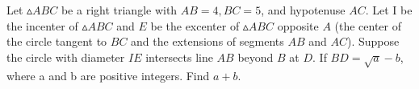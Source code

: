 Let $\vartriangle ABC$ be a right triangle with $AB = 4, BC = 5$, and hypotenuse $AC$. Let I be the incenter of $\vartriangle ABC$ and $E$ be the excenter of $\vartriangle ABC$ opposite $A$ (the center of the circle tangent to $BC$ and the extensions of segments $AB$ and $AC$). Suppose the circle with diameter $IE$ intersects line $AB$ beyond $B$ at $D$. If $BD =\sqrt{a}- b$, where a and b are positive integers. Find $a + b$.